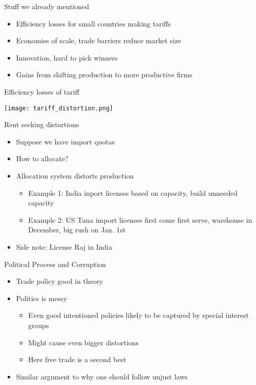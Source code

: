 \documentclass{beamer}
\begin{document}
\begin{frame}{Stuff we already mentioned}

    \begin{itemize}
        \item Efficiency losses for small countries making tariffs
        \item Economies of scale, trade barriers reduce market size 
        \item Innovation, hard to pick winners
        \item Gains from shifting production to more productive firms
    \end{itemize}

\end{frame}

\begin{frame}{Efficiency losses of tariff}

    \texttt{[image: tariff\_distortion.png]}

\end{frame}

\begin{frame}{Rent seeking distortions}

    \begin{itemize}
        \item Suppose we have import quotas
        \item How to allocate?
        \item Allocation system distorts production
        \begin{itemize}
            \item Example 1: India inport licenses based on capacity, build unneeded capacity
            \item Example 2: US Tuna import licenses first come first serve, warehouse in December, big rush on Jan. 1st
        \end{itemize}
        \item Side note: License Raj in India
    \end{itemize}

\end{frame}

\begin{frame}{Political Process and Corruption}

    \begin{itemize}
        \item Trade policy good in theory
        \item Politics is messy
        \begin{itemize}
            \item Even good intentioned policies likely to be captured by special interest groups
            \item Might cause even bigger distortions
            \item Here free trade is a second best 
        \end{itemize} 
        \item Similar argument to why one should follow unjust laws
    \end{itemize}

\end{frame}
\end{document}
